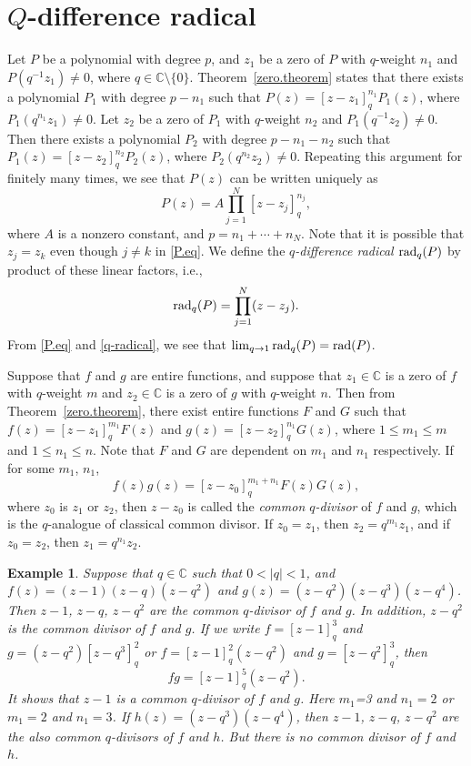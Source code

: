 \documentclass[a4paper,12pt]{article}
\newcommand{\C}{\mathbb{C}}
\newtheorem{exa}{Example}[section]
\newenvironment{example}{\begin{exa}\rm}{\end{exa}}
\numberwithin{equation}{section}
\begin{document}
\section{$Q$-difference radical}

Let $P$ be a polynomial with degree $p$, and $z_1$ be a zero of $P$ with $q$-weight $n_1$ and $P(q^{-1}z_1)\neq 0$, where $q\in\C\setminus\{0\}$. Theorem~\ref{zero.theorem} states that there exists a polynomial $P_1$ with degree $p-n_1$ such that $P(z)=[z-z_1]_q^{n_1}P_1(z)$, where $P_1(q^{n_1}z_1)\neq 0$.
Let $z_2$ be a zero of $P_1$ with $q$-weight $n_2$ and $P_1(q^{-1}z_2)\neq 0$.
Then there exists a polynomial $P_2$ with degree $p-n_1-n_2$ such that $P_1(z)=[z-z_2]_q^{n_2}P_2(z)$, where $P_2(q^{n_2}z_2)\neq 0$.
Repeating this argument for finitely many times, we see that $P(z)$ can be written uniquely as
\begin{equation}\label{P.eq}
P(z)=A\prod_{j=1}^N[z-z_j]^{n_j}_q,
\end{equation}
where $A$ is a nonzero constant, and $p=n_1+\cdots+n_N$.
Note that it is possible that $z_j=z_k$ even though $j\ne k$ in \eqref{P.eq}.
We define the \emph{$q$-difference radical ${\rm rad}_q(P)$} by product of these linear factors, i.e.,
\begin{equation}\label{q-radical}
{\rm rad}_q(P)=\prod_{j=1}^N(z-z_j).
\end{equation}
From \eqref{P.eq} and \eqref{q-radical}, we see that $\lim_{q\to 1}{\rm rad}_q(P)={\rm rad}(P)$.

Suppose that $f$ and $g$ are entire functions, and suppose that $z_1\in\C$ is a zero of $f$ with $q$-weight $m$ and $z_2\in\C$ is a zero of $g$ with $q$-weight $n$.
Then from Theorem~\ref{zero.theorem}, there exist entire functions $F$ and $G$ such that
$f(z)=[z-z_1]_q^{m_1}F(z)$ and $g(z)=[z-z_2]_q^{n_1}G(z)$, where $1\leq m_1\leq m$ and $1\leq n_1\leq n$.
Note that $F$ and $G$ are dependent on $m_1$ and $n_1$ respectively. If for some $m_1$, $n_1$,
    $$
    f(z)g(z)=[z-z_0]_q^{m_1+n_1}F(z)G(z),
    $$
where $z_0$ is $z_1$ or $z_2$, then $z-z_0$ is called the \emph{common $q$-divisor} of $f$ and $g$, which is the $q$-analogue of classical common divisor. If $z_0=z_1$, then $z_2=q^{m_1}z_1$, and if $z_0=z_2$, then $z_1=q^{n_1}z_2$.

\begin{example}
Suppose that $q\in\C$ such that $0<|q|<1$, and
$f(z)=(z-1)(z-q)(z-q^2)$ and $g(z)=(z-q^2)(z-q^3)(z-q^4)$. Then $z-1$, $z-q$, $z-q^2$ are the common $q$-divisor of $f$ and $g$.
In addition, $z-q^2$ is the common divisor of $f$ and $g$.
If we write $f=[z-1]_q^3$ and $g=(z-q^2)[z-q^3]_q^2$ or $f=[z-1]^2_q(z-q^2)$ and $g=[z-q^2]_q^3$, then
    $$
    fg=[z-1]_q^5(z-q^2).
    $$
It shows that $z-1$ is a common $q$-divisor of $f$ and $g$. Here $m_1$=3 and $n_1=2$ or $m_1=2$ and $n_1=3$.
If $h(z)=(z-q^3)(z-q^4)$, then $z-1$, $z-q$, $z-q^2$ are the also common $q$-divisors of $f$ and $h$. But there is no common divisor of $f$ and $h$.
\end{example}
\end{document}
